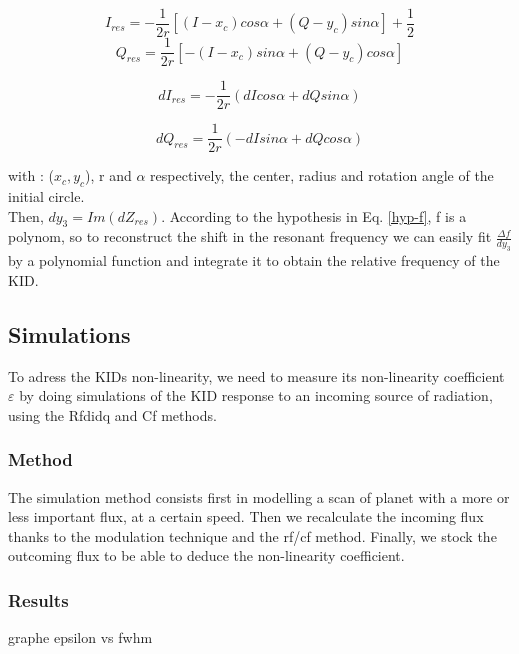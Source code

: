 \begin{equation}
I_{res} = - \frac{1}{2r}[(I-x_{c})cos\alpha + (Q - y_{c})sin \alpha] + \frac{1}{2}
\end{equation}
\begin{equation}
 Q_{res} = \frac{1}{2r}[-(I-x_{c})sin\alpha + (Q - y_{c})cos \alpha] 
\end{equation}

\begin{equation}
dI_{res} = -\frac{1}{2r}(dI cos\alpha + dQ sin\alpha)
\end{equation}

\begin{equation}
dQ_{res} = \frac{1}{2r}(-dI sin\alpha + dQ cos\alpha)
\end{equation}

with : ($x_{c}, y_{c}$), r and $\alpha$ respectively, the center, radius and rotation angle of the initial circle.\\
Then, $dy_{3} = Im(dZ_{res})$. According to the hypothesis in Eq. \ref{hyp-f}, f is a polynom, so to reconstruct the shift in the resonant frequency we can easily fit $\frac{\Delta f}{dy_{3}}$ by a polynomial function and integrate it to obtain the relative frequency of the KID.


\subsection{Simulations}
To adress the KIDs non-linearity, we need to measure its non-linearity coefficient $\varepsilon$ by doing simulations of the KID response to an incoming source of radiation, using the Rfdidq and Cf methods.

	\subsubsection{Method}
The simulation method consists first in modelling a scan of planet with a more or less important flux, at a certain speed. Then we recalculate the incoming flux thanks to the modulation technique and the rf/cf method. Finally, we stock the outcoming flux to be able to deduce the non-linearity coefficient.

	\subsubsection{Results}
graphe epsilon vs fwhm

